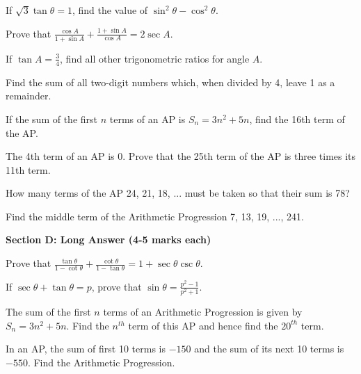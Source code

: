 \documentclass[12pt,a4paper]{exam}
\begin{document}
\begin{questions}
\question[3] If $\sqrt{3} \tan \theta = 1$, find the value of $\sin^2 \theta - \cos^2 \theta$.
\vspace{0.15cm}

\question[3] Prove that $\frac{\cos A}{1 + \sin A} + \frac{1 + \sin A}{\cos A} = 2 \sec A$.
\vspace{0.15cm}

\question[3] If $\tan A = \frac{3}{4}$, find all other trigonometric ratios for angle $A$.
\vspace{0.15cm}

\question[3] Find the sum of all two-digit numbers which, when divided by 4, leave 1 as a remainder.
\vspace{0.15cm}

\question[3] If the sum of the first $n$ terms of an AP is $S_n = 3n^2 + 5n$, find the 16th term of the AP.
\vspace{0.15cm}

\question[3] The 4th term of an AP is 0. Prove that the 25th term of the AP is three times its 11th term.
\vspace{0.15cm}

\question[3] How many terms of the AP 24, 21, 18, ... must be taken so that their sum is 78?
\vspace{0.15cm}

\question[3] Find the middle term of the Arithmetic Progression 7, 13, 19, ..., 241.
\vspace{0.15cm}

\end{questions}
\bigskip
\noindent\textbf{\large Section D: Long Answer (4-5 marks each)}

\begin{questions}
\question[5] Prove that $\frac{\tan \theta}{1 - \cot \theta} + \frac{\cot \theta}{1 - \tan \theta} = 1 + \sec \theta \csc \theta$.
\vspace{0.15cm}

\question[5] If $\sec \theta + \tan \theta = p$, prove that $\sin \theta = \frac{p^2 - 1}{p^2 + 1}$.
\vspace{0.15cm}

\question[5] The sum of the first $n$ terms of an Arithmetic Progression is given by $S_n = 3n^2 + 5n$. Find the $n^{th}$ term of this AP and hence find the $20^{th}$ term.
\vspace{0.15cm}

\question[5] In an AP, the sum of first 10 terms is $-150$ and the sum of its next 10 terms is $-550$. Find the Arithmetic Progression.
\vspace{0.15cm}

\end{questions}
\bigskip
\end{document}

